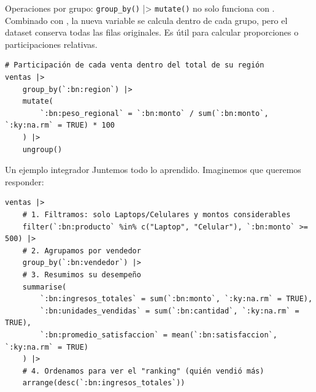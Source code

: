 \documentclass[8pt]{beamer}
\begin{document}
\begin{frame}[fragile]{Operaciones por grupo: \texttt{group\_by()} |> \texttt{mutate()}}
 no solo funciona con . Combinado con , la nueva variable se calcula dentro de cada grupo, pero el dataset conserva todas las filas originales. Es útil para calcular proporciones o participaciones relativas.

\begin{lstlisting}[style=RScript]
# Participación de cada venta dentro del total de su región
ventas |>
	group_by(`:bn:region`) |>
	mutate(
		`:bn:peso_regional` = `:bn:monto` / sum(`:bn:monto`, `:ky:na.rm` = TRUE) * 100
	) |>
	ungroup()
\end{lstlisting}
\end{frame}




\begin{frame}[fragile]{Un ejemplo integrador}
Juntemos todo lo aprendido. Imaginemos que queremos responder: 
\begin{lstlisting}[style=RScript]
ventas |>
	# 1. Filtramos: solo Laptops/Celulares y montos considerables
	filter(`:bn:producto` %in% c("Laptop", "Celular"), `:bn:monto` >= 500) |>
	# 2. Agrupamos por vendedor
	group_by(`:bn:vendedor`) |>
	# 3. Resumimos su desempeño
	summarise(
		`:bn:ingresos_totales` = sum(`:bn:monto`, `:ky:na.rm` = TRUE),
		`:bn:unidades_vendidas` = sum(`:bn:cantidad`, `:ky:na.rm` = TRUE),
		`:bn:promedio_satisfaccion` = mean(`:bn:satisfaccion`, `:ky:na.rm` = TRUE)
	) |>
	# 4. Ordenamos para ver el "ranking" (quién vendió más)
	arrange(desc(`:bn:ingresos_totales`))
\end{lstlisting}
\end{frame}
\end{document}
